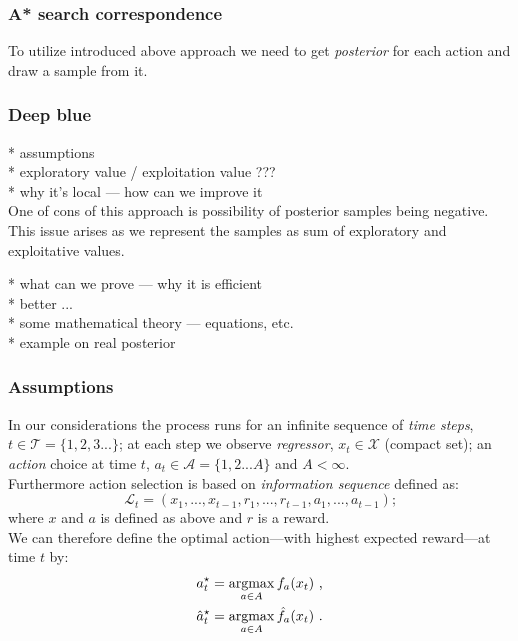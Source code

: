 \documentclass[12pt, a4paper, pdflatex, leqno]{report}
\newcommand{\argmax}{\operatornamewithlimits{argmax}}
\begin{document}
\subsubsection{A* search correspondence}
To utilize introduced above approach we need to get \emph{posterior} for each action and draw a sample from it.


\subsubsection{Deep blue}
* assumptions\\
* exploratory value / exploitation value ???\\

* why it's local --- how can we improve it\\
One of cons of this approach is possibility of posterior samples being negative. This issue arises as we represent the samples as sum of exploratory and exploitative values.

* what can we prove --- why it is efficient\\
* better ...\ \\
* some mathematical theory --- equations, etc.\~\\
* example on real posterior\\

\subsubsection{Assumptions}
In our considerations the process runs for an infinite sequence of \emph{time steps}, $t \in \mathscr{T} = \{ 1,2,3... \}$; at each step we observe \emph{regressor}, $x_t \in \mathscr{X}$ (compact set); an \emph{action} choice at time $t$, $a_t \in \mathscr{A} = \{ 1,2...A \}$ and $A<\infty$.\\
Furthermore action selection is based on \emph{information sequence} defined as:
$$
  \mathscr{L}_t = ( x_1,...,x_{t-1}, r_1,...,r_{t-1}, a_1,...,a_{t-1} ) \text{;}
$$
where $x$ and $a$ is defined as above and $r$ is a reward.\\

We can therefore define the optimal action---with highest expected reward---at time $t$ by:
\begin{eqnarray}
  a_t^\star = \argmax_{a \in A} f_a (x_t) \text{ ,}\\
  \hat{a}_t^\star = \argmax_{a \in A} \hat{f}_a (x_t) \text{ .}
\end{eqnarray}
\end{document}
